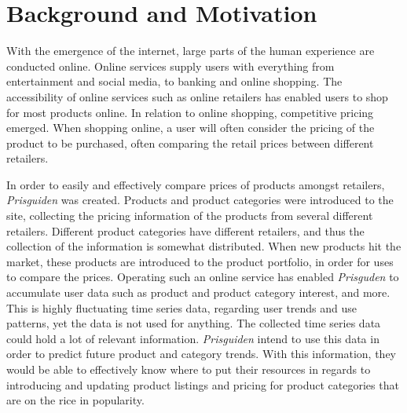 
\section{Background and Motivation}\label{cit}
\label{section:Introduction:BackgroundAndMotivation}


With the emergence of the internet, large parts of the human experience are conducted online.
Online services supply users with everything from entertainment and social media, to banking and online shopping.
The accessibility of online services such as online retailers has enabled users to shop for most products online.
In relation to online shopping, competitive pricing emerged.
When shopping online, a user will often consider the pricing of the product to be purchased, often comparing the retail prices between different retailers.


In order to easily and effectively compare prices of products amongst retailers, 
\textit{Prisguiden} was created.
Products and product categories were introduced to the site, collecting the pricing information of the products from several different retailers.
Different product categories have different retailers, and thus the collection of the information is somewhat distributed.
When new products hit the market, these products are introduced to the product portfolio, in order for uses to compare the prices.
Operating such an online service has enabled \textit{Prisguden} to accumulate user data such as product and product category interest, and more.
This is highly fluctuating time series data, regarding user trends and use patterns, yet the data is not used for anything.
The collected time series data could hold a lot of relevant information.
\textit{Prisguiden} intend to use this data in order to predict future product and category trends.
With this information, they would be able to effectively know where to put their resources in regards to introducing and updating product listings and pricing for product categories 
that are on the rice in popularity.
\linebreak





